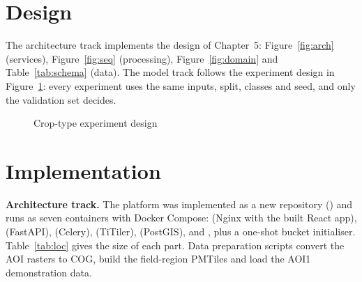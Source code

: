 \section{Design}
The architecture track implements the design of Chapter~5: Figure~\ref{fig:arch} (services),
Figure~\ref{fig:seq} (processing), Figure~\ref{fig:domain} and Table~\ref{tab:schema} (data). The
model track follows the experiment design in Figure~\ref{fig:experiment}: every experiment uses the
same inputs, split, classes and seed, and only the validation set decides.

\begin{figure}[htbp]
\centering
{}
\caption{Crop-type experiment design}
\label{fig:experiment}
\end{figure}

\section{Implementation}
\textbf{Architecture track.} The platform was implemented as a new repository
() and runs as seven containers with Docker Compose:  (Nginx with
the built React app),  (FastAPI),  (Celery),  (TiTiler),
 (PostGIS),  and , plus a one-shot bucket initialiser.
Table~\ref{tab:loc} gives the size of each part. Data preparation scripts convert the AOI rasters to
COG, build the field-region PMTiles and load the AOI1 demonstration data.

